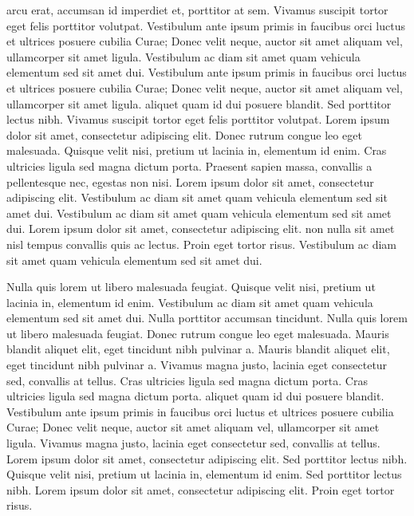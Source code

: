\documentclass{article}
\begin{document}
 arcu erat, accumsan id imperdiet et, porttitor at sem. Vivamus suscipit tortor eget felis porttitor volutpat. Vestibulum ante ipsum primis in faucibus orci luctus et ultrices posuere cubilia Curae; Donec velit neque, auctor sit amet aliquam vel, ullamcorper sit amet ligula. Vestibulum ac diam sit amet quam vehicula elementum sed sit amet dui. Vestibulum ante ipsum primis in faucibus orci luctus et ultrices posuere cubilia Curae; Donec velit neque, auctor sit amet aliquam vel, ullamcorper sit amet ligula.  aliquet quam id dui posuere blandit. Sed porttitor lectus nibh. Vivamus suscipit tortor eget felis porttitor volutpat. Lorem ipsum dolor sit amet, consectetur adipiscing elit. Donec rutrum congue leo eget malesuada. Quisque velit nisi, pretium ut lacinia in, elementum id enim. Cras ultricies ligula sed magna dictum porta. Praesent sapien massa, convallis a pellentesque nec, egestas non nisi. Lorem ipsum dolor sit amet, consectetur adipiscing elit. Vestibulum ac diam sit amet quam vehicula elementum sed sit amet dui. Vestibulum ac diam sit amet quam vehicula elementum sed sit amet dui. Lorem ipsum dolor sit amet, consectetur adipiscing elit.  non nulla sit amet nisl tempus convallis quis ac lectus. Proin eget tortor risus. Vestibulum ac diam sit amet quam vehicula elementum sed sit amet dui.

Nulla quis lorem ut libero malesuada feugiat. Quisque velit nisi, pretium ut lacinia in, elementum id enim. Vestibulum ac diam sit amet quam vehicula elementum sed sit amet dui. Nulla porttitor accumsan tincidunt. Nulla quis lorem ut libero malesuada feugiat. Donec rutrum congue leo eget malesuada. Mauris blandit aliquet elit, eget tincidunt nibh pulvinar a. Mauris blandit aliquet elit, eget tincidunt nibh pulvinar a. Vivamus magna justo, lacinia eget consectetur sed, convallis at tellus. Cras ultricies ligula sed magna dictum porta. Cras ultricies ligula sed magna dictum porta.  aliquet quam id dui posuere blandit. Vestibulum ante ipsum primis in faucibus orci luctus et ultrices posuere cubilia Curae; Donec velit neque, auctor sit amet aliquam vel, ullamcorper sit amet ligula. Vivamus magna justo, lacinia eget consectetur sed, convallis at tellus. Lorem ipsum dolor sit amet, consectetur adipiscing elit. Sed porttitor lectus nibh. Quisque velit nisi, pretium ut lacinia in, elementum id enim. Sed porttitor lectus nibh. Lorem ipsum dolor sit amet, consectetur adipiscing elit. Proin eget tortor risus.
\end{document}
